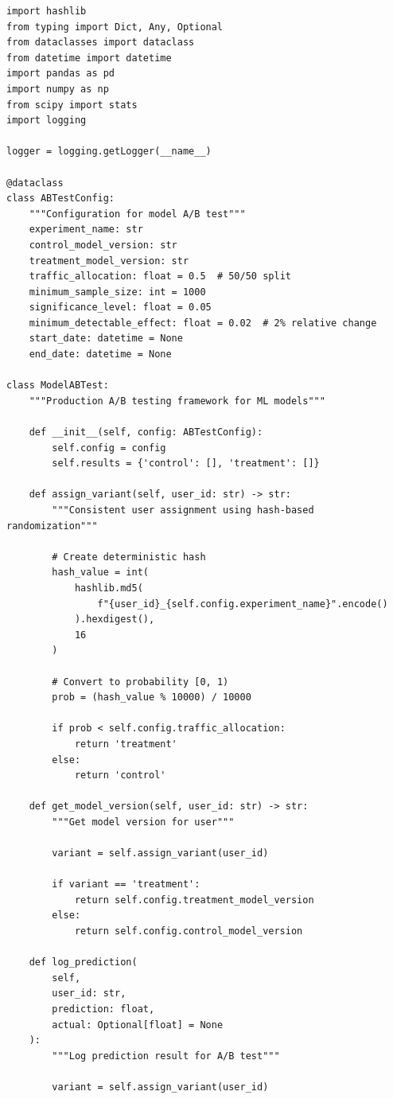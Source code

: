 \begin{lstlisting}[style=python, caption=A/B Testing Framework for ML Models]
import hashlib
from typing import Dict, Any, Optional
from dataclasses import dataclass
from datetime import datetime
import pandas as pd
import numpy as np
from scipy import stats
import logging

logger = logging.getLogger(__name__)

@dataclass
class ABTestConfig:
    """Configuration for model A/B test"""
    experiment_name: str
    control_model_version: str
    treatment_model_version: str
    traffic_allocation: float = 0.5  # 50/50 split
    minimum_sample_size: int = 1000
    significance_level: float = 0.05
    minimum_detectable_effect: float = 0.02  # 2% relative change
    start_date: datetime = None
    end_date: datetime = None

class ModelABTest:
    """Production A/B testing framework for ML models"""

    def __init__(self, config: ABTestConfig):
        self.config = config
        self.results = {'control': [], 'treatment': []}

    def assign_variant(self, user_id: str) -> str:
        """Consistent user assignment using hash-based randomization"""

        # Create deterministic hash
        hash_value = int(
            hashlib.md5(
                f"{user_id}_{self.config.experiment_name}".encode()
            ).hexdigest(),
            16
        )

        # Convert to probability [0, 1)
        prob = (hash_value % 10000) / 10000

        if prob < self.config.traffic_allocation:
            return 'treatment'
        else:
            return 'control'

    def get_model_version(self, user_id: str) -> str:
        """Get model version for user"""

        variant = self.assign_variant(user_id)

        if variant == 'treatment':
            return self.config.treatment_model_version
        else:
            return self.config.control_model_version

    def log_prediction(
        self,
        user_id: str,
        prediction: float,
        actual: Optional[float] = None
    ):
        """Log prediction result for A/B test"""

        variant = self.assign_variant(user_id)


\end{lstlisting}
